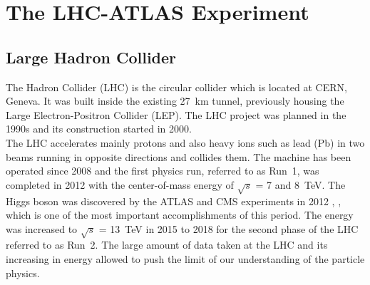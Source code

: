 \chapter{The LHC-ATLAS Experiment}
\label{chap:LHCATLAS}
\section{Large Hadron Collider}

The 
Hadron Collider (LHC) is the circular collider which is located at CERN, Geneva. It was built inside the existing 27~km tunnel, previously housing the Large Electron-Positron Collider (LEP). The LHC project was planned in the 1990s and its construction started in 2000. \\
The LHC accelerates mainly protons and also heavy ions such as lead (Pb) in two beams running in opposite directions and collides them. 
The machine has been operated since 2008 and the first physics run, referred to as Run~1, was completed in 2012 with the center-of-mass energy of $\sqrt{s}$ = 7 and 8~TeV. The Higgs boson was discovered by the ATLAS and CMS experiments in 2012 \cite{HIGG-2012-27}, \cite{CMS-HIG-12-028}, which is one of the most important accomplishments of this period. The energy was increased to $\sqrt{s}$ = 13~TeV in 2015 to 2018 for the second phase of the LHC referred to as Run~2. 
The large amount of data taken at the LHC and its increasing in energy allowed to push the limit of our understanding of the particle physics. 

